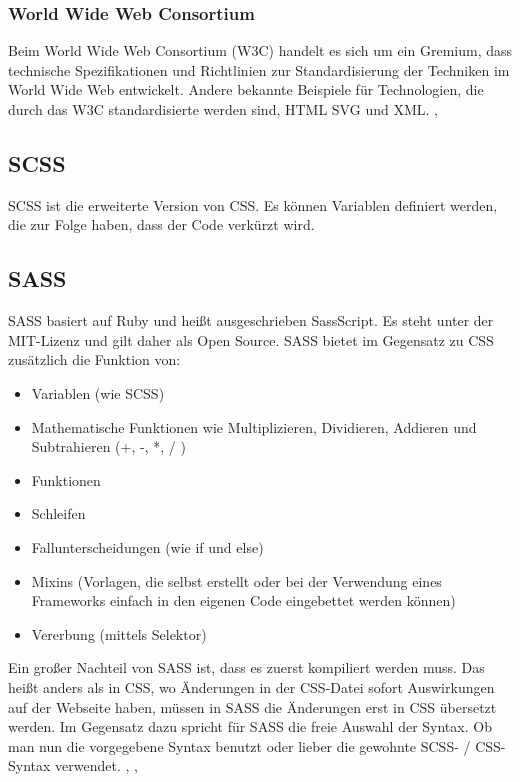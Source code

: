 \subsubsection{World Wide Web Consortium}
Beim World Wide Web Consortium (W3C) handelt es sich um ein Gremium, dass technische 
Spezifikationen und Richtlinien zur Standardisierung der Techniken im World Wide Web entwickelt.
Andere bekannte Beispiele für Technologien, die durch das W3C standardisierte werden sind, HTML 
SVG und XML. \cite{noauthor_world_nodate}, \cite{noauthor_world_2022}

\subsection{SCSS}
SCSS ist die erweiterte Version von CSS. Es können Variablen definiert werden, die zur Folge haben, dass
der Code verkürzt wird. \cite{noauthor_unterschied_nodate}

\subsection{SASS}
\label{chap:stylesheet}
SASS basiert auf Ruby und heißt ausgeschrieben SassScript. Es steht unter der MIT-Lizenz und gilt daher als Open Source.
SASS bietet im Gegensatz zu CSS zusätzlich die Funktion von: 
\begin{itemize}
    \item Variablen (wie SCSS)
    \item Mathematische Funktionen wie Multiplizieren, Dividieren, Addieren und Subtrahieren (+, -, *, / )
    \item Funktionen
    \item Schleifen
    \item Fallunterscheidungen (wie if und else)
    \item Mixins (Vorlagen, die selbst erstellt oder bei der Verwendung eines Frameworks einfach in den eigenen Code eingebettet werden können)
    \item Vererbung (mittels Selektor)
\end{itemize}
Ein großer Nachteil von SASS ist, dass es zuerst kompiliert werden muss. Das heißt anders als in CSS,
wo Änderungen in der CSS-Datei sofort Auswirkungen auf der Webseite haben, müssen in SASS die Änderungen
erst in CSS übersetzt werden. Im Gegensatz dazu spricht für SASS die freie Auswahl der Syntax. Ob man nun die vorgegebene 
Syntax benutzt oder lieber die gewohnte SCSS- / CSS-Syntax verwendet. \cite{noauthor_sass_nodate}, \cite{noauthor_sass_nodate-2}, \cite{noauthor_grose_nodate}

